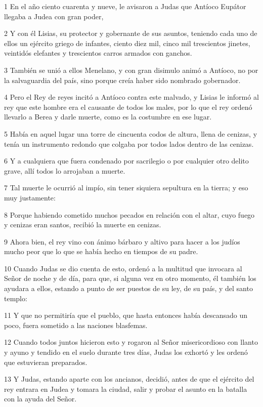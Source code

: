 \par 1 En el año ciento cuarenta y nueve, le avisaron a Judas que Antíoco Eupátor llegaba a Judea con gran poder,
\par 2 Y con él Lisias, su protector y gobernante de sus asuntos, teniendo cada uno de ellos un ejército griego de infantes, ciento diez mil, cinco mil trescientos jinetes, veintidós elefantes y trescientos carros armados con ganchos.
\par 3 También se unió a ellos Menelano, y con gran disimulo animó a Antíoco, no por la salvaguardia del país, sino porque creía haber sido nombrado gobernador.
\par 4 Pero el Rey de reyes incitó a Antíoco contra este malvado, y Lisias le informó al rey que este hombre era el causante de todos los males, por lo que el rey ordenó llevarlo a Berea y darle muerte, como es la costumbre en ese lugar.
\par 5 Había en aquel lugar una torre de cincuenta codos de altura, llena de cenizas, y tenía un instrumento redondo que colgaba por todos lados dentro de las cenizas.
\par 6 Y a cualquiera que fuera condenado por sacrilegio o por cualquier otro delito grave, allí todos lo arrojaban a muerte.
\par 7 Tal muerte le ocurrió al impío, sin tener siquiera sepultura en la tierra; y eso muy justamente:
\par 8 Porque habiendo cometido muchos pecados en relación con el altar, cuyo fuego y cenizas eran santos, recibió la muerte en cenizas.
\par 9 Ahora bien, el rey vino con ánimo bárbaro y altivo para hacer a los judíos mucho peor que lo que se había hecho en tiempos de su padre.
\par 10 Cuando Judas se dio cuenta de esto, ordenó a la multitud que invocara al Señor de noche y de día, para que, si alguna vez en otro momento, él también los ayudara a ellos, estando a punto de ser puestos de su ley, de su país, y del santo templo:
\par 11 Y que no permitiría que el pueblo, que hasta entonces había descansado un poco, fuera sometido a las naciones blasfemas.
\par 12 Cuando todos juntos hicieron esto y rogaron al Señor misericordioso con llanto y ayuno y tendido en el suelo durante tres días, Judas los exhortó y les ordenó que estuvieran preparados.
\par 13 Y Judas, estando aparte con los ancianos, decidió, antes de que el ejército del rey entrara en Judea y tomara la ciudad, salir y probar el asunto en la batalla con la ayuda del Señor.

